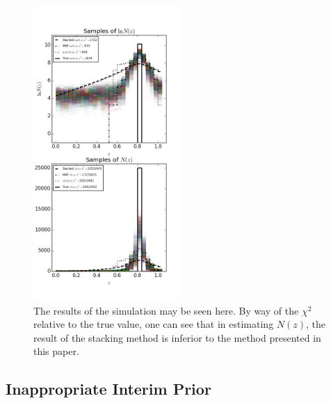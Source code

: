 \documentclass[preprint]{aastex}
\begin{document}
\begin{figure}
\includegraphics[width=0.5\textwidth]{samps-toy.png}
\caption{The results of the simulation may be seen here.  By way of the $\chi^{2}$ relative to the true value, one can see that in estimating $N(z)$, the result of the stacking method is inferior to the method presented in this paper.}
\label{fig:dumbestparam}
\end{figure}



\clearpage
\subsection{Inappropriate Interim Prior}
\label{sec:interim}
\end{document}
